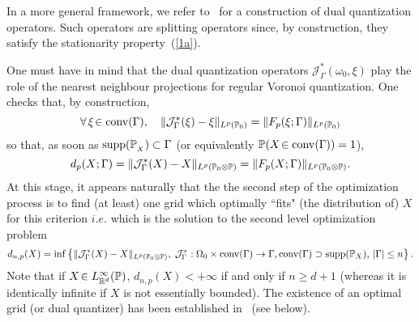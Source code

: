 In a more  general framework, we refer to~\cite{dualStat}
for a construction of dual quantization operators. Such operators are splitting operators since,  by construction, they satisfy the stationarity  property~(\ref{1a}).

\smallskip One must have in mind that the dual quantization operators $\mathcal{J}^*_{\Gamma}(\omega_0, \xi) $   play the  role of the nearest neighbour projections for regular Voronoi quantization. One checks that, by construction, 
\[
\forall\, \xi\!\in \operatorname{conv}(\Gamma),\quad \|\mathcal{J}^*_{\Gamma}(\xi)-\xi\|_{L^p(\mathbb{P}_0)}= \|F_p(\xi;\Gamma)\|_{L^p(\mathbb{P}_0)}
\]
so that, as soon as  ${\rm supp}(\mathbb{P}_{_X})\subset \Gamma$ (or equivalently $\mathbb{P}(X\!\in \operatorname{conv}(\Gamma))=1$),
\[
d_{p}(X;\Gamma) = \| \mathcal{J}^*_{\Gamma}(X)-X\|_{L^p(\mathbb{P}_0\otimes \mathbb{P})}= \|F_p(X;\Gamma)\|_{L^p(\mathbb{P}_0\otimes \mathbb{P})}.
\] 
At this stage, it appears naturally that the the second step of the optimization process is to find (at least) one grid  which optimally
``fits" (the distribution of) $X$ for this criterion $i.e.$ which is the solution to the second
level  optimization problem 
\[ 
d_{n,p}(X)
=\inf\left\{\|\mathcal{J}^*_{\Gamma}(X)-X\|_{L^p(\mathbb{P}_0\otimes \mathbb{P})}, \;
\mathcal{J}^*_{\Gamma}: \Omega_0\times \operatorname{conv}(\Gamma)\to \Gamma,
\operatorname{conv}(\Gamma)\supset {\rm supp}(\mathbb{P}_X),\, |\Gamma|\le n\right\}. 
\] 
Note that
if $X\!\in L_{\mathbb{R}^d}^{\infty}(\mathbb{P})$, $d_{n,p}(X)<+\infty$ if and only if $n\ge d+1$ (whereas it is
identically infinite if $X$ is not essentially bounded). The existence of an
optimal grid (or dual quantizer) has been established in~\cite{dualStat} (see below). 

